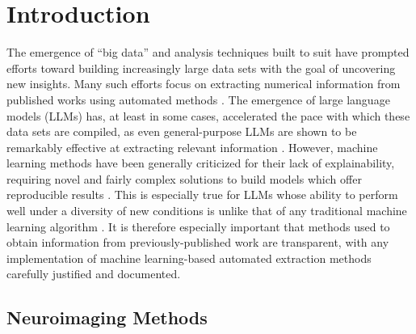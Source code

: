 

\section{Introduction}
\label{sec:papertag.introduction}

The emergence of ``big data'' and analysis techniques built to suit have prompted efforts toward building increasingly large data sets with the goal of uncovering new insights. Many such efforts focus on extracting numerical information from published works using automated methods \cite{OlivettiEtAl2020}. The emergence of large language models (LLMs) has, at least in some cases, accelerated the pace with which these data sets are compiled, as even general-purpose LLMs are shown to be remarkably effective at extracting relevant information \cite{PolakEtAl2023, DunnEtAl2022}. However, machine learning methods have been generally criticized for their lack of explainability, requiring novel and fairly complex solutions to build models which offer reproducible results \cite{DuEtAl2019, Doshi-VelezKim2017}. This is especially true for LLMs whose ability to perform well under a diversity of new conditions is unlike that of any traditional machine learning algorithm \cite{ZhaoEtAl2024}. It is therefore especially important that methods used to obtain information from previously-published work are transparent, with any implementation of machine learning-based automated extraction methods carefully justified and documented.

\subsection{Neuroimaging Methods}

